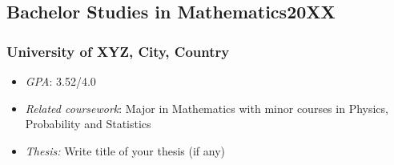 \documentclass[11pt]{article}
\begin{document}
    \subsection{Bachelor Studies in Mathematics\hfill \normalfont 20XX}  
    
    \subsubsection{University of XYZ,  City, Country}
    \begin{itemize}
        \item[\checkmark] \textit{GPA}: 3.52/4.0
        \item[\checkmark] \textit{Related coursework}: Major in Mathematics with minor courses in Physics, Probability and Statistics
        \item[\checkmark] \textit{Thesis:} Write title of your thesis (if any)
        \end{itemize}
        
    
\end{document}
